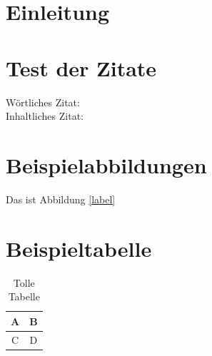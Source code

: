 \documentclass[12pt, ngerman]{article}
\renewcommand{\listoffigures}{\begingroup
	\tocsection
	\tocfile{\listfigurename}{lof}
\endgroup}
\begin{document}


\setcounter{page}{2}

\abstract
\clearpage
\tableofcontents
\clearpage
{}
\section{Einleitung}
\clearpage

\section{Test der Zitate}
Wörtliches Zitat:  \\
Inhaltliches Zitat: 

\section{Beispielabbildungen}
Das ist Abbildung \ref{label}

\section{Beispieltabelle}
\begin{table}[h!]
    \centering
    \begin{tabular}{|c|c|}
        A & B \\ \hline
        C & D
    \end{tabular}
    \caption{Tolle Tabelle}
\end{table}


\clearpage
\printbibliography[title=\section{Literaturverzeichnis}]
\listoffigures
\listoftables
\end{document}
